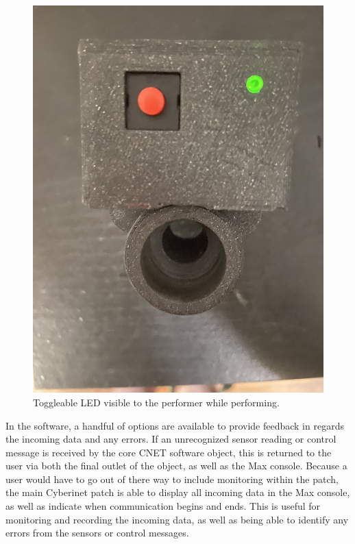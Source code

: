 \begin{figure}
    \centering
    \includegraphics[scale=0.05]{diagrams/IMG_2211.JPG}
    \caption{Toggleable LED visible to the performer while performing.}
    \label{fig:msgLED}
\end{figure}


In the software, a handful of options are available to provide feedback in regards the incoming data and any errors. If an unrecognized sensor reading or control message is received by the core CNET software object, this is returned to the user via both the final outlet of the object, as well as the Max console. Because a user would have to go out of there way to include monitoring within the patch, the main Cyberinet patch is able to display all incoming data in the Max console, as well as indicate when communication begins and ends. This is useful for monitoring and recording the incoming data, as well as being able to identify any errors from the sensors or control messages.


